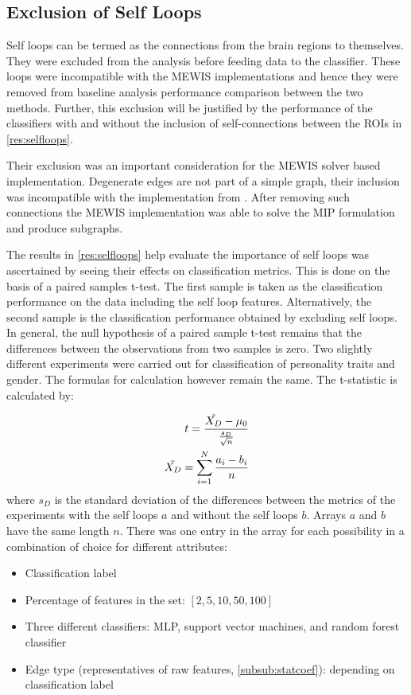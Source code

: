 \documentclass[msthesis.tex]{subfiles}
\begin{document}
\subsection{Exclusion of Self Loops}
\label{sec:exclusion}
Self loops can be termed as the connections from the brain regions to themselves. They were excluded from the analysis before feeding data to the classifier. These loops were incompatible with the \gls{MEWIS} implementations and hence they were removed from baseline analysis performance comparison between the two methods. Further, this exclusion will be justified by the performance of the classifiers with and without the inclusion of self-connections between the ROIs in \autoref{res:selfloops}. 

Their exclusion was an important consideration for the \gls{MEWIS} solver based implementation. Degenerate edges are not part of a simple graph, their inclusion was incompatible with the implementation from \cite{DBLP:journals/corr/LobodaAS16}. After removing such connections the \gls{MEWIS} implementation was able to solve the \gls{MIP} formulation and produce subgraphs.

The results in \autoref{res:selfloops} help evaluate the importance of self loops was ascertained by seeing their effects on classification metrics. This is done on the basis of a paired samples t-test. The first sample is taken as the classification performance on the  data including the self loop features. Alternatively, the second sample is the classification performance obtained by excluding self loops. In general, the null hypothesis of a paired sample t-test remains that the differences between the observations from two samples is zero. Two slightly different experiments were carried out for classification of personality traits and gender. The formulas for calculation however remain the same. The t-statistic is calculated by:

\begin{align}
    \label{eq:pairedtest}
    t = \frac{\Tilde{X_{D}} - \mu_0}{\frac{s_{D}}{\sqrt{n}}} \\
    \Tilde{X_D} = \sum_{i=1}^{N} \frac{a_{i} - b_{i}}{n}
\end{align}where $s_D$ is the standard deviation of the differences between the metrics of the experiments with the self loops $a$ and without the self loops $b$. Arrays $a$ and $b$ have the same length $n$. There was one entry in the array for each possibility in a combination of choice for different attributes:
\begin{itemize}
    \item Classification label
    \item Percentage of features in the set: $[2,5,10,50,100]$
    \item Three different classifiers: MLP, support vector machines, and random forest classifier 
    \item Edge type (representatives of raw features, \autoref{subsub:statcoef}): depending on classification label
\end{itemize}
\end{document}
